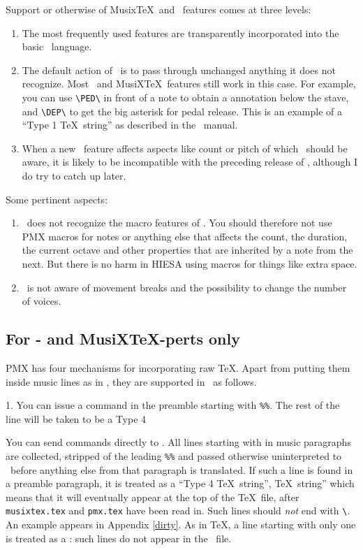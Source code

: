 \documentclass[11pt]{article}
\begin{document}
Support or otherwise of Musix\TeX\ and \PMX\ features comes at three 
levels:
\begin{enumerate}
 \item  The most frequently used features are transparently 
incorporated into the basic \MTx\ language.
 \item  The default action of \MTx\ is to pass through unchanged 
anything it does not recognize.  Most \PMX\ and MusiX\TeX\ features 
still work in this case.  For example, you can use \verb"\PED\"  
in front of a 
note to obtain a  annotation below the stave, and \verb"\DEP\" 
to get the big asterisk for pedal release.  This is an example of a ``Type 1
\TeX\ string''  as 
described in the \PMX\ manual.  
 \item  When a new \PMX\ feature affects aspects like count
or pitch of which \MTx\ should be aware, it is likely to be
incompatible with the preceding release of \MTx, although I do try
to catch up later.
\end{enumerate}

Some pertinent aspects:
\begin{enumerate}
 \item \MTx\current\ does not recognize the macro features of \PMX.
You should therefore not use PMX macros for notes or anything else that 
affects the count, the duration, the current octave and other properties
that are inherited by a note from the next.  But there is no harm in
HIESA
using macros for things like extra space.
 \item \MTx\current\ is not aware of movement breaks and the possibility 
to change the number of voices.
 \end{enumerate}

\subsection{For \PMX- and MusiX\TeX-perts only}  \label{expert}

PMX has four mechanisms for incorporating raw \TeX. Apart from putting
them inside music lines as in \PMX, they are supported in \MTx\ as follows.

1. You can issue a command in the preamble starting with \verb`%%`.
The rest of the line will be taken to be a Type 4 


You can send commands directly to .  All lines starting with 
\ttxem{\%\%} in music paragraphs are collected, stripped of the leading 
\verb"%%" and passed otherwise uninterpreted to \PMX\ before anything 
else from that paragraph is translated.    If such a line
is found in a preamble paragraph, it is treated as a ``Type 4 \TeX\ string'',
\TeX\ string'' 
which means that it will eventually appear at the top of the \TeX\ file,
after \texttt{musixtex.tex} and \texttt{pmx.tex} have been read in.  
Such lines should \emph{not} end with \verb"\".
An example appears in Appendix \ref{dirty}.
As in \TeX, a line starting with only one \ttxem{\%} is treated as a 
: such lines do not appear in the \PMX\ file. 
\end{document}
